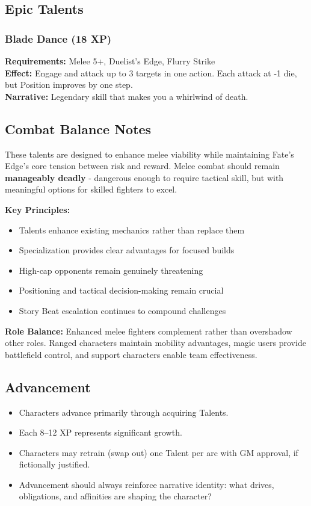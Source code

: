 \subsection{Epic Talents}

\subsubsection{Blade Dance (18 XP)}
\textbf{Requirements:} Melee 5+, Duelist's Edge, Flurry Strike \\
\textbf{Effect:} Engage and attack up to 3 targets in one action. Each attack at -1 die, but Position improves by one step. \\
\textbf{Narrative:} Legendary skill that makes you a whirlwind of death.

\subsection{Combat Balance Notes}

These talents are designed to enhance melee viability while maintaining Fate's Edge's core tension between risk and reward. Melee combat should remain \textbf{manageably deadly} - dangerous enough to require tactical skill, but with meaningful options for skilled fighters to excel.

\textbf{Key Principles:}
\begin{itemize}
    \item Talents enhance existing mechanics rather than replace them
    \item Specialization provides clear advantages for focused builds
    \item High-cap opponents remain genuinely threatening
    \item Positioning and tactical decision-making remain crucial
    \item Story Beat escalation continues to compound challenges
\end{itemize}

\textbf{Role Balance:} Enhanced melee fighters complement rather than overshadow other roles. Ranged characters maintain mobility advantages, magic users provide battlefield control, and support characters enable team effectiveness.

\subsection{Advancement}
\begin{itemize}
  \item Characters advance primarily through acquiring Talents.
  \item Each 8–12 XP represents significant growth.
  \item Characters may retrain (swap out) one Talent per arc with GM approval, if fictionally justified.
  \item Advancement should always reinforce narrative identity: what drives, obligations, and affinities are shaping the character?
\end{itemize}


